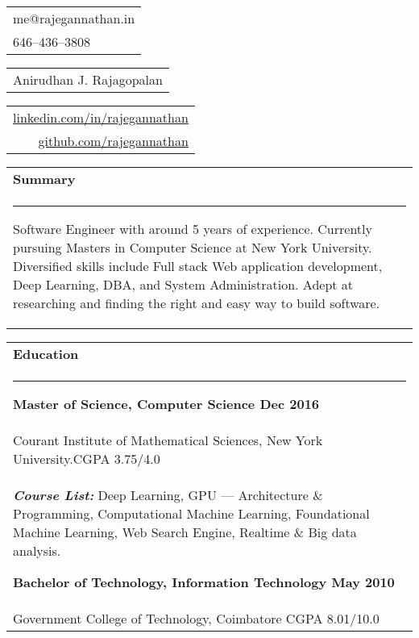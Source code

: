 \documentclass{article}
\begin{document}
{\small\begin{tabular}[c]{l}
	me@rajegannathan.in \\
	646--436--3808
\end{tabular}}\hfill%
{\Large\bfseries\begin{tabular}[c]{c}
	Anirudhan J. Rajagopalan
\end{tabular}}\hfill%
{\small\begin{tabular}[c]{r}
	\href{https://linkedin.com/in/rajegannathan}{linkedin.com/in/rajegannathan} \\
	\href{https://github.com/rajegannathan}{github.com/rajegannathan}
\end{tabular}}%

\bigskip

\begin{tabular}{p{\dimexpr\linewidth-2\tabcolsep}}
	\textbf{\large{Summary}}\\
	\noindent\rule{\textwidth}{0.4pt}
	\small{Software Engineer with around 5 years of experience.  Currently pursuing Masters in Computer Science at New York University.  Diversified skills include Full stack Web application development, Deep Learning, DBA, and System Administration.  Adept at researching and finding the right and easy way to build software.}
\end{tabular}

\bigskip

\begin{tabular}{p{\dimexpr\linewidth-2\tabcolsep}}
	\textbf{\large{Education}} \\
	\noindent\rule{\textwidth}{0.4pt}
	{\bfseries Master of Science, Computer Science \hfill Dec 2016} \\
	\quad Courant Institute of Mathematical Sciences, New York University.\hfill CGPA 3.75/4.0\\
	\quad \textbf{\textit{Course List:}} Deep Learning, GPU --- Architecture \& Programming, Computational Machine Learning, Foundational Machine Learning, Web Search Engine, Realtime \& Big data analysis.

	\bigskip
	{\bfseries Bachelor of Technology, Information Technology \hfill May 2010} \\
	\quad Government College of Technology, Coimbatore \hfill CGPA 8.01/10.0
\end{tabular}

\bigskip
\end{document}

